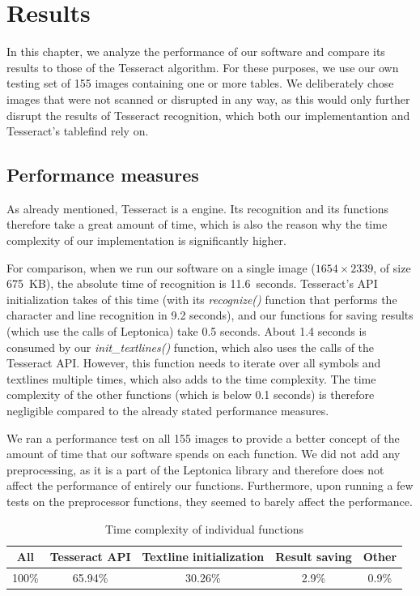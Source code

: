 \chapter{Results}

In this chapter, we analyze the performance of our software and compare its results to those of the Tesseract  algorithm. For these purposes, we use our own testing set of 155 images containing one or more tables. We deliberately chose images that were not scanned or disrupted in any way, as this would only further disrupt the results of Tesseract recognition, which both our implementantion and Tesseract's tablefind rely on.

\section{Performance measures}

As already mentioned, Tesseract is a  engine. Its recognition and its functions therefore take a great amount of time, which is also the reason why the time complexity of our implementation is significantly higher.

For comparison, when we run our software on a single image ($1654\times2339$, of size 675~KB), the absolute time of recognition is 11.6~seconds. Tesseract's API initialization takes  of this time (with its \emph{recognize()} function that performs the character and line recognition in 9.2 seconds), and our functions for saving results (which use the calls of Leptonica) take 0.5 seconds. About 1.4 seconds is consumed by our \emph{init\_textlines()} function, which also uses the calls of the Tesseract API. However, this function needs to iterate over all symbols and textlines multiple times, which also adds to the time complexity. The time complexity of the other functions (which is below 0.1 seconds) is therefore negligible compared to the already stated performance measures.

We ran a performance test on all 155 images to provide a better concept of the amount of time that our software spends on each function. We did not add any preprocessing, as it is a part of the Leptonica library and therefore does not affect the performance of entirely our functions. Furthermore, upon running a few tests on the preprocessor functions, they seemed to barely affect the performance.

\begin{table}[t]
\centering
\begin{tabular}{ccccc}
\toprule
\textbf{All} & \textbf{Tesseract API} & \textbf{Textline initialization} & \textbf{Result saving} & \textbf{Other}\\
\midrule
100\% & 65.94\% & 30.26\% & 2.9\% & 0.9\% \\
\bottomrule
\end{tabular}
\caption{Time complexity of individual functions} 
\label{table:functionsComplexity}
\end{table}

